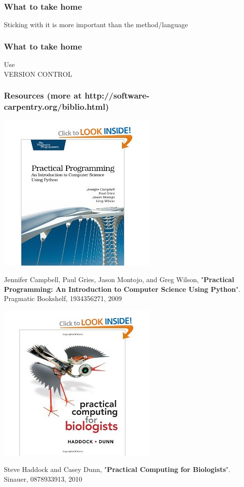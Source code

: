 \documentclass{beamer}
\begin{document}
\begin{frame}
\frametitle{What to take home}
\centering
{\huge Sticking with it is more important than the method/language}
\end{frame}

\begin{frame}
\frametitle{What to take home}
\centering
{\huge Use}\\
{\Huge VERSION CONTROL}
\end{frame}

\begin{frame}
\frametitle{Resources (more at http://software-carpentry.org/biblio.html)}

\includegraphics[width=.15\textwidth]{PracticalProgramming}\quad
\begin{minipage}[b]{.75\textwidth}
\footnotesize
Jennifer Campbell, Paul Gries, Jason Montojo, and Greg Wilson, "{\bfseries Practical Programming: An Introduction to Computer Science Using Python}". Pragmatic Bookshelf, 1934356271, 2009\\
\end{minipage}

\bigskip

\includegraphics[width=.15\textwidth]{Computing4Biologists}\quad
\begin{minipage}[b]{.75\textwidth}
\footnotesize
Steve Haddock and Casey Dunn, "{\bfseries Practical Computing for Biologists}". Sinauer, 0878933913, 2010\\\null\\
\end{minipage}



\end{frame}






\end{document}
